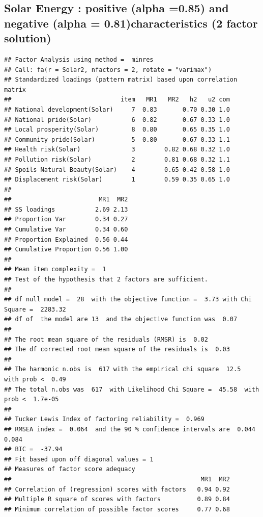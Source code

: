 \documentclass[
]{article}
\begin{document}
\begin{landscape}
\newpage

\hypertarget{solar-energy-positive-alpha-0.85-and-negative-alpha-0.81characteristics-2-factor-solution}{%
\subsection{Solar Energy : positive (alpha =0.85) and negative (alpha =
0.81)characteristics (2 factor
solution)}\label{solar-energy-positive-alpha-0.85-and-negative-alpha-0.81characteristics-2-factor-solution}}

\begin{verbatim}
## Factor Analysis using method =  minres
## Call: fa(r = Solar2, nfactors = 2, rotate = "varimax")
## Standardized loadings (pattern matrix) based upon correlation matrix
##                              item   MR1   MR2   h2   u2 com
## National development(Solar)     7  0.83       0.70 0.30 1.0
## National pride(Solar)           6  0.82       0.67 0.33 1.0
## Local prosperity(Solar)         8  0.80       0.65 0.35 1.0
## Community pride(Solar)          5  0.80       0.67 0.33 1.1
## Health risk(Solar)              3        0.82 0.68 0.32 1.0
## Pollution risk(Solar)           2        0.81 0.68 0.32 1.1
## Spoils Natural Beauty(Solar)    4        0.65 0.42 0.58 1.0
## Displacement risk(Solar)        1        0.59 0.35 0.65 1.0
## 
##                        MR1  MR2
## SS loadings           2.69 2.13
## Proportion Var        0.34 0.27
## Cumulative Var        0.34 0.60
## Proportion Explained  0.56 0.44
## Cumulative Proportion 0.56 1.00
## 
## Mean item complexity =  1
## Test of the hypothesis that 2 factors are sufficient.
## 
## df null model =  28  with the objective function =  3.73 with Chi Square =  2283.32
## df of  the model are 13  and the objective function was  0.07 
## 
## The root mean square of the residuals (RMSR) is  0.02 
## The df corrected root mean square of the residuals is  0.03 
## 
## The harmonic n.obs is  617 with the empirical chi square  12.5  with prob <  0.49 
## The total n.obs was  617  with Likelihood Chi Square =  45.58  with prob <  1.7e-05 
## 
## Tucker Lewis Index of factoring reliability =  0.969
## RMSEA index =  0.064  and the 90 % confidence intervals are  0.044 0.084
## BIC =  -37.94
## Fit based upon off diagonal values = 1
## Measures of factor score adequacy             
##                                                    MR1  MR2
## Correlation of (regression) scores with factors   0.94 0.92
## Multiple R square of scores with factors          0.89 0.84
## Minimum correlation of possible factor scores     0.77 0.68
\end{verbatim}


\end{landscape}
\end{document}
